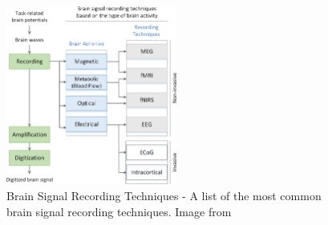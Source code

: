 \begin{figure}[htbp!]
    \centering
    \includegraphics[width=0.5\textwidth]{Figures/Related/brain_signal_recording_techniques}
    \caption{Brain Signal Recording Techniques - A list of the most common brain signal recording techniques. Image from~\cite{altaheri2023deep}}\label{fig:brain_signal_recording_techniques}
\end{figure}
